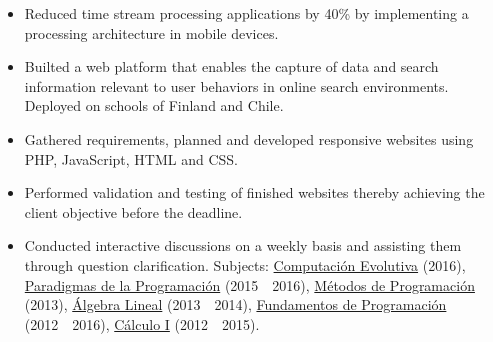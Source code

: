 \documentclass[10pt,letterpaper]{article}
\begin{document}
	\vspace{\separationAfterHeaderBeforeItem}
	\begin{itemize}[noitemsep,topsep=0pt]
			\begin{itemize}[label=\textbullet,noitemsep,topsep=0pt]
				\item Reduced time stream processing applications by 40\% by implementing a processing architecture in mobile devices.
				\item Builted a web platform that enables the capture of data and search information relevant to user behaviors in online search environments. Deployed on schools of Finland and Chile.
			\end{itemize}

		\vspace{\separationBetweenItems}

			\begin{itemize}[label=\textbullet,noitemsep,topsep=0pt]
				\item Gathered requirements, planned and developed responsive websites using PHP, JavaScript, HTML and CSS.
				\item Performed validation and testing of finished websites thereby achieving the client objective before the deadline.
			\end{itemize}
		
		\vspace{\separationBetweenItems}
			\begin{itemize}[label=\textbullet]
				\itemsep0em
				\item Conducted interactive discussions on a weekly basis and assisting them through question clarification. Subjects: \ul{Computaci\'on Evolutiva} (2016), \ul{Paradigmas de la Programaci\'on} (2015\ \textendash \ 2016), \ul{M\'etodos de Programaci\'on} (2013), \ul{\'Algebra Lineal} (2013\ \textendash \ 2014), \ul{Fundamentos de Programaci\'on} (2012\ \textendash \ 2016), \ul{C\'alculo I} (2012\ \textendash \ 2015).
			\end{itemize}
	\end{itemize}
\end{document}
